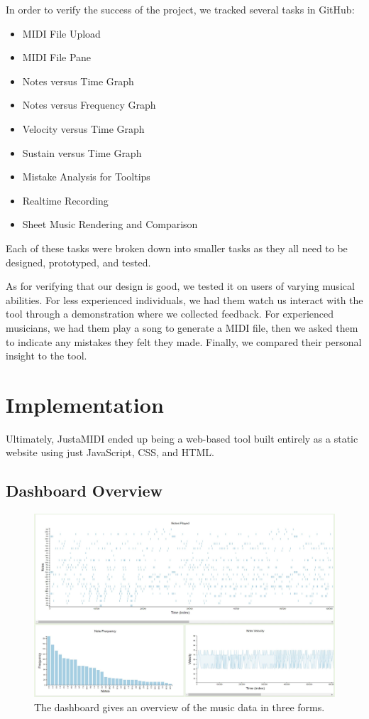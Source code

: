 \documentclass[journal]{vgtc}                %
\begin{document}
In order to verify the success of the project, we tracked several tasks in
GitHub:

\begin{itemize}
  \item MIDI File Upload
  \item MIDI File Pane
  \item Notes versus Time Graph
  \item Notes versus Frequency Graph
  \item Velocity versus Time Graph
  \item Sustain versus Time Graph
  \item Mistake Analysis for Tooltips
  \item Realtime Recording
  \item Sheet Music Rendering and Comparison
\end{itemize}

Each of these tasks were broken down into smaller tasks as they all need to be
designed, prototyped, and tested.

As for verifying that our design is good, we tested it on users of varying musical
abilities. For less experienced individuals, we had them watch us interact with
the tool through a demonstration where we collected feedback. For experienced
musicians, we had them play a song to generate a MIDI file, then we asked them
to indicate any mistakes they felt they made. Finally, we compared their
personal insight to the tool.

\section{Implementation}

Ultimately, JustaMIDI ended up being a web-based tool built entirely as a
static website using just JavaScript, CSS, and HTML.

\subsection{Dashboard Overview}

\begin{figure}[h]
  \centering
  \includegraphics[width=\columnwidth]{dashboard-single-track}
  \caption{The dashboard gives an overview of the music data in three forms.}
  \label{fig:dashboard}
\end{figure}
\end{document}
